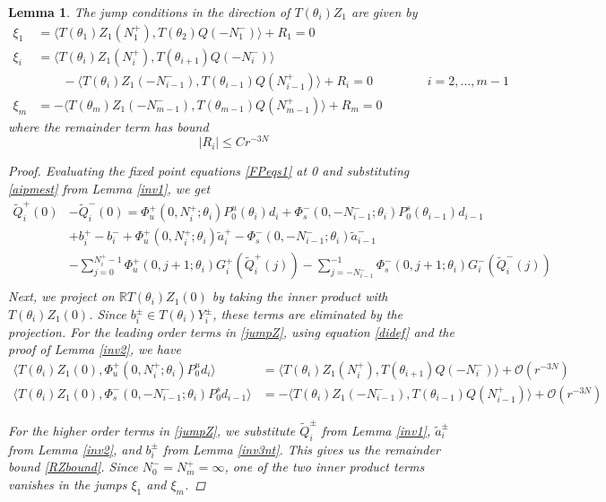 \documentclass[12pt]{article}
\def\R{{\mathbb R}}
\newtheorem{lemma}{Lemma}
\begin{document}
\begin{lemma}\label{jumpZlemma}
The jump conditions in the direction of $T(\theta_i) Z_1$ are given by
\begin{equation*}
\begin{aligned}
\xi_1 &= \langle T(\theta_1) Z_1(N_1^+), T(\theta_{2}) Q(-N_1^-) \rangle + R_1 = 0 \\
\xi_i &= \langle T(\theta_i) Z_1(N_i^+), T(\theta_{i+1}) Q(-N_i^-) \rangle \\
&\qquad-\langle T(\theta_i) Z_1(-N_{i-1}^-), T(\theta_{i-1}) Q(N_{i-1}^+) \rangle + R_i = 0 && \qquad i = 2, \dots, m-1 \\
\xi_m &= -\langle T(\theta_m) Z_1(-N_{m-1}^-), T(\theta_{m-1}) Q(N_{m-1}^+) \rangle + R_m = 0
\end{aligned}
\end{equation*}
where the remainder term has bound
\begin{equation}\label{RZbound}
|R_i| \leq C r^{-3N}
\end{equation}
\begin{proof}
Evaluating the fixed point equations \eqref{FPeqs1} at 0 and substituting \eqref{aipmest} from Lemma \ref{inv1}, we get
\begin{align*}
\tilde{Q}_i^+(0) &- \tilde{Q}_i^-(0) = \Phi_u^+(0, N_i^+; \theta_i) P_0^u(\theta_i) d_i + \Phi_s^-(0, -N_{i-1}^-; \theta_i) P_0^s(\theta_{i-1}) d_{i-1} \\
&+ b_i^+ - b_i^- 
+ \Phi_u^+(0, N_i^+; \theta_i) \tilde{a}_i^+ - \Phi_s^-(0, -N_{i-1}^-; \theta_i) \tilde{a}_{i-1}^- \\
&- \sum_{j = 0}^{N_i^+-1} \Phi_u^+(0, j+1; \theta_i) G_i^+(\tilde{Q}_i^+(j)) 
- \sum_{j = -N_{i-1}^-}^{-1} \Phi_s^-(0, j+1; \theta_i) G_i^-(\tilde{Q}_i^-(j)) \\
\end{align*}
Next, we project on $\R T(\theta_i) Z_1(0)$ by taking the inner product with $T(\theta_i) Z_1(0)$. Since $b_i^\pm \in T(\theta_i) Y_i^\pm$, these terms are eliminated by the projection. For the leading order terms in \eqref{jumpZ}, using equation \eqref{didef} and the proof of Lemma \ref{inv2}, we have
\begin{align*}
\langle T(\theta_i) Z_1(0), \Phi_u^+(0, N_i^+; \theta_i) P_0^u d_i \rangle
&= \langle T(\theta_i) Z_1(N_i^+), T(\theta_{i+1}) Q(-N_i^-) \rangle + \mathcal{O}(r^{-3N}) \\
\langle T(\theta_i) Z_1(0), \Phi_s^-(0, -N_{i-1}^-; \theta_i) P_0^s d_{i-1} \rangle
&= -\langle T(\theta_i) Z_1(-N_{i-1}^-), T(\theta_{i-1}) Q(N_{i-1}^+) \rangle + \mathcal{O}(r^{-3N})
\end{align*}

For the higher order terms in \eqref{jumpZ}, we substitute $\tilde{Q}_i^\pm$ from Lemma \ref{inv1}, $\tilde{a}_i^\pm$ from Lemma \ref{inv2}, and $b_i^\pm$ from Lemma \ref{inv3nt}. This gives us the remainder bound \eqref{RZbound}. Since $N_0^- = N_m^+ = \infty$, one of the two inner product terms vanishes in the jumps $\xi_1$ and $\xi_m$. 
\end{proof}
\end{lemma}
\end{document}
